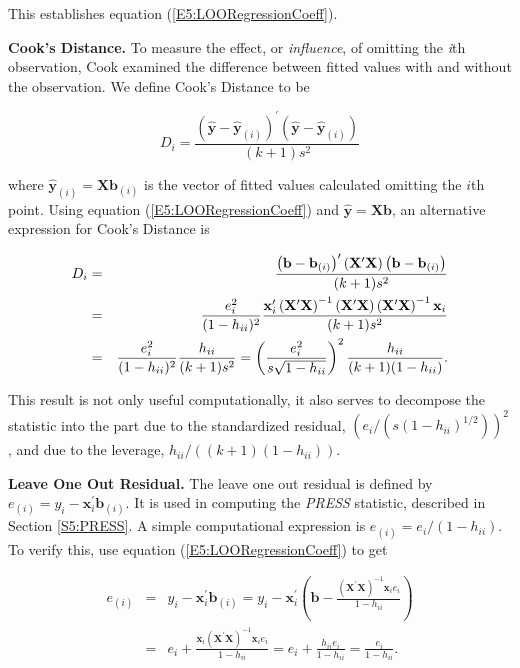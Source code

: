 \noindent This establishes equation (\ref{E5:LOORegressionCoeff}).

\textbf{Cook's Distance.} To measure the effect, or
\textit{influence}, of omitting the \textit{i}th observation, Cook
examined the difference between fitted values with and without the
observation. We define Cook's Distance to be
\begin{center}
\[
D_i=\frac{\left( \mathbf{\hat{y}-\hat{y}}_{(i)}\right)
^{\prime}\left( \mathbf{\hat{y}-\hat{y}}_{(i)}\right) }{(k+1)s^2}
\]
\end{center}
where $\mathbf{\hat{y}}_{(i)}=\mathbf{Xb}_{(i)}$ is the vector of
fitted values calculated omitting the $i$th point. Using equation
(\ref{E5:LOORegressionCoeff}) and $\mathbf{\hat{y}}=\mathbf{Xb}$, an
alternative expression for Cook's Distance is
\begin{center}
\begin{eqnarray*}
D_i &=&\frac{\left( \mathbf{b-b}_{(i)}\right) ^{\prime}\left( \mathbf{X}%
^{\prime}\mathbf{X}\right) \left( \mathbf{b-b}_{(i)}\right) }{(k+1)s^2} \\
&=&\frac{e_i^2}{(1-h_{ii})^2}\frac{\mathbf{x}_i^{\prime}\left(
\mathbf{X}^{\prime}\mathbf{X}\right) ^{-1}\left( \mathbf{X}^{\prime}\mathbf{X}\right) \left( \mathbf{X}^{\prime}\mathbf{X}\right) ^{-1}\mathbf{%
x}_i}{(k+1)s^2} \\
&=&\frac{e_i^2}{(1-h_{ii})^2}\frac{h_{ii}}{(k+1)s^2}=\left(
\frac{e_i^2}{s\sqrt{1-h_{ii}}}\right) ^2\frac{h_{ii}}{%
(k+1)(1-h_{ii})}.
\end{eqnarray*}
\end{center}
This result is not only useful computationally, it also serves to
decompose
the statistic into the part due to the standardized residual, $\left( e%
_i/\left( s\left( 1-h_{ii}\right) ^{1/2}\right) \right) ^2$, and due
to the leverage, $h_{ii}/\left( \left( k+1\right) \left(
1-h_{ii}\right) \right) $.


\textbf{Leave One Out Residual.} The leave one out residual is defined by $%
e_{(i)}=y_i-\mathbf{x}_i^{\prime}\mathbf{b}_{(i)}$. It is used in
computing the \textit{PRESS} statistic, described in Section
\ref{S5:PRESS}. A simple computational expression is
$e_{(i)}=e_i/(1-h_{ii})$. To verify this, use equation
(\ref{E5:LOORegressionCoeff}) to get
\begin{center}
\begin{eqnarray*}
e_{(i)} &=&y_i-\mathbf{x}_i^{\prime}\mathbf{b}_{(i)}=y_i-%
\mathbf{x}_i^{\prime}\left( \mathbf{b}-\frac{\left( \mathbf{X}^{\prime}%
\mathbf{X}\right) ^{-1}\mathbf{x}_ie_i}{1-h_{ii}}\right)  \\
&=&e_i+\frac{\mathbf{x}_i\left( \mathbf{X}^{\prime}\mathbf{X}%
\right) ^{-1}\mathbf{x}_ie_i}{1-h_{ii}}=e_i+\frac{h_{ii}
e_i}{1-h_{ii}}=\frac{e_i}{1-h_{ii}}.
\end{eqnarray*}
\end{center}

